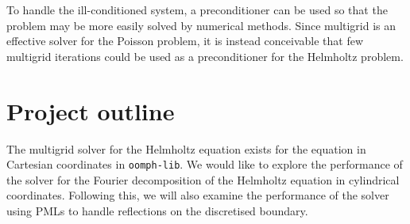 To handle the ill-conditioned system, a preconditioner can be used so that the problem may be more easily solved by numerical methods.
Since multigrid is an effective solver for the Poisson problem, it is instead conceivable that few multigrid iterations could be used as a preconditioner for the Helmholtz problem.







\section{Project outline}

The multigrid solver for the Helmholtz equation exists for the equation in Cartesian coordinates in \texttt{oomph-lib}.
We would like to explore the performance of the solver for the Fourier decomposition of the Helmholtz equation in cylindrical coordinates.
Following this, we will also examine the performance of the solver using PMLs to handle reflections on the discretised boundary.

